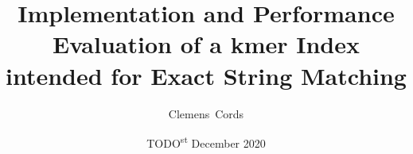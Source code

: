 \newcommand{\institute}{Institute of Computer Science}
\newcommand{\department}{Department of Computer Science and Mathematics}
\newcommand{\university}{Freie Universit\"at Berlin}
\newcommand{\researchGroup}{Databases and Information Systems}
\newcommand{\city}{Berlin}
\newcommand{\country}{Germany}

\title{Implementation and Performance Evaluation of a kmer Index intended for Exact String Matching}
\newcommand{\Year}{2020}
\date{TODO\textsuperscript{st} December \Year}
\newcommand{\thesisKind}{Bachelor}
\newcommand{\degree}{Bachelor~of~Science}
\newcommand{\versionnumber}{1.0}

\author{Clemens~Cords}
\newcommand{\matrikelno}{4872639}
\newcommand{\email}{clemens.cords@fu-berlin.de}

\newcommand{\supervisor}{Prof. Dr. Knut Reinert}
\newcommand{\supervisorUniversity}{Freie Universit\"at Berlin}
\newcommand{\supervisorDepartment}{Dept. of Computer Science and Mathematics}
\newcommand{\supervisorAG}{Algorithmische Bioinformatik}
\newcommand{\supervisorCountry}{Germany}

\newcommand{\fstAdvisor}{Enrico Seiler}
\newcommand{\fstAdvisorsUniversity}{Freie Universit\"at Berlin}
\newcommand{\fstAdvisorsDepartment}{Dept. of Computer Science and Mathematics}
\newcommand{\fstAdvisorsAG}{Algorithmische Bioinformatik}
\newcommand{\fstAdvisorsCountry}{Germany}

\newcommand{\sndAdvisor}{Prof. Dr. Knut Reinert}
\newcommand{\sndAdvisorsUniversity}{Freie Universit\"at Berlin} %
\newcommand{\sndAdvisorsDepartment}{Dept. of Computer Science and Mathematics}
\newcommand{\sndAdvisorsAG}{Algorithmische Bioinformatik}
\newcommand{\sndAdvisorsCountry}{Germany}


